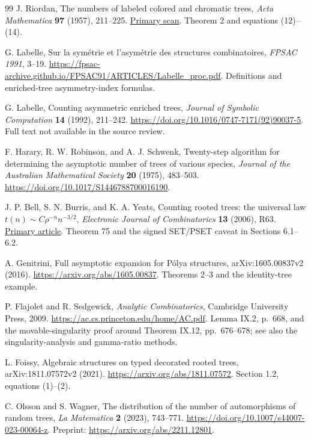 \documentclass[11pt]{article}
\theoremstyle{definition}
\begin{document}
\begin{thebibliography}{99}
J. Riordan, The numbers of labeled colored and chromatic trees,
\emph{Acta Mathematica} \textbf{97} (1957), 211--225.
\href{https://archive.ymsc.tsinghua.edu.cn/pacm_download/117/5849-11511_2006_Article_BF02392398.pdf}{Primary scan}.
Theorem 2 and equations (12)--(14).

G. Labelle, Sur la sym\'etrie et l'asym\'etrie des structures combinatoires,
\emph{FPSAC 1991}, 3--19.
\url{https://fpsac-archive.github.io/FPSAC91/ARTICLES/Labelle_proc.pdf}.
Definitions and enriched-tree asymmetry-index formulas.

G. Labelle, Counting asymmetric enriched trees,
\emph{Journal of Symbolic Computation} \textbf{14} (1992), 211--242.
\url{https://doi.org/10.1016/0747-7171(92)90037-5}.
Full text not available in the source review.

F. Harary, R. W. Robinson, and A. J. Schwenk,
Twenty-step algorithm for determining the asymptotic number of trees of various species,
\emph{Journal of the Australian Mathematical Society} \textbf{20} (1975), 483--503.
\url{https://doi.org/10.1017/S1446788700016190}.

J. P. Bell, S. N. Burris, and K. A. Yeats,
Counting rooted trees: the universal law $t(n)\sim C\rho^{-n}n^{-3/2}$,
\emph{Electronic Journal of Combinatorics} \textbf{13} (2006), R63.
\href{https://www.combinatorics.org/ojs/index.php/eljc/article/download/v13i1r63/pdf/}{Primary article}.
Theorem 75 and the signed SET/PSET caveat in Sections 6.1--6.2.

A. Genitrini, Full asymptotic expansion for P\'olya structures,
arXiv:1605.00837v2 (2016).
\url{https://arxiv.org/abs/1605.00837}.
Theorems 2--3 and the identity-tree example.

P. Flajolet and R. Sedgewick, \emph{Analytic Combinatorics},
Cambridge University Press, 2009.
\url{https://ac.cs.princeton.edu/home/AC.pdf}.
Lemma IX.2, p.~668, and the movable-singularity proof around Theorem IX.12,
pp.~676--678; see also the singularity-analysis and gamma-ratio methods.

L. Foissy, Algebraic structures on typed decorated rooted trees,
arXiv:1811.07572v2 (2021).
\url{https://arxiv.org/abs/1811.07572}.
Section 1.2, equations (1)--(2).

C. Olsson and S. Wagner, The distribution of the number of automorphisms of random trees,
\emph{La Matematica} \textbf{2} (2023), 743--771.
\url{https://doi.org/10.1007/s44007-023-00064-z}.
Preprint: \url{https://arxiv.org/abs/2211.12801}.


\end{thebibliography}
\end{document}
